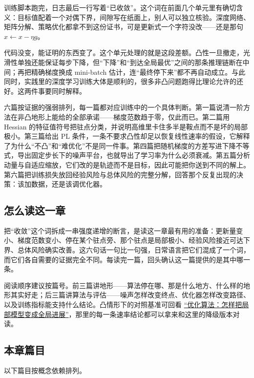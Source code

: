 训练脚本跑完，日志最后一行写着``已收敛''。这个词在前面几个单元里有确切含义：目标值配着一个对偶下界，间隙写在纸面上，别人可以独立核验。深度网络、矩阵分解、策略优化都拿不到这份证书，可是更新式一个字符没改——还是那句 \(x\leftarrow x-\eta g\)。

代码没变，能证明的东西变了。这个单元处理的就是这段差额。凸性一旦撤走，光滑性单独还能保证每步下降，但``下降''和``到达全局最优''之间的那条推理链断在中间；再把精确梯度换成 mini-batch 估计，连``最终停下来''都不再自动成立。与此同时，实践里的深度学习训练大体是顺利的，很多非凸问题跑得比理论允许的还好。这两件事要同时解释。

六篇按证据的强弱排列，每一篇都对应训练中的一个具体判断。第一篇说清一阶方法在非凸地形上能给的全部承诺——梯度范数趋于零，仅此而已。第二篇用 Hessian 的特征值符号把驻点分类，并说明高维里卡住多半是鞍点而不是坏的局部极小。第三篇给出 PL 条件，一条不要求凸性却足以恢复线性速率的假设，它解释了为什么``不凸''和``难优化''不是同一件事。第四篇把随机梯度的方差写进下降不等式，导出固定步长下的噪声平台，也就导出了学习率为什么必须衰减。第五篇分析动量与自适应缩放，它们改的是轨迹而不是目标，因此可能把你送到不同的解上。第六篇把训练损失放回经验风险与总体风险的完整分解，回答那个反复出现的决策：该加数据，还是该调优化器。

\subsection{怎么读这一章}

把``收敛''这个词拆成一串强度递增的断言，是读这一章最有用的准备：更新量变小、梯度范数变小、停在某个驻点旁、那个驻点是局部极小、经验风险接近可达下界、总体风险确实改善。这六句话一句比一句强，日常语言把它们混成了一个词，而它们各自需要的证据完全不同。每读完一篇，回头确认这一篇提供的是其中哪一条。

阅读顺序建议按篇号。前三篇讲地形——算法停在哪、那是什么地方、什么样的地形其实好走；后三篇讲算法与评估——噪声怎样改变终点、优化器怎样改变路径、以及训练指标能支持什么结论。凸情形下的对照基准可回看 \hyperref[ch:076]{``优化算法：怎样把局部模型变成全局进展''}，那里的每一条速率结论都可以拿来和这里的降级版本对读。

\subsection{本章篇目}

以下篇目按概念依赖排列。

